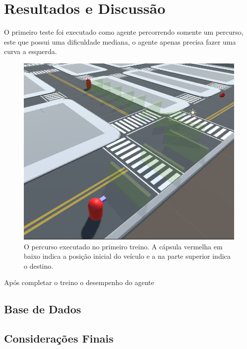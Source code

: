 \chapter{Resultados e Discussão}\label{cap:resultados}

O primeiro teste foi executado como agente percorrendo somente um percurso, este que possui uma dificuldade mediana, o agente apenas precisa fazer uma curva a esquerda.

\begin{figure}[h]
    \centering
    \includegraphics[scale=0.35]{figs/rotas/path_1.png}
     \caption{O percurso executado no primeiro treino. A cápsula vermelha em baixo indica a posição inicial do veículo e a na parte superior indica o destino.}
     \label{fig:rota-1}
  \end{figure}
 
Após completar o treino o desempenho do agente 

\section{Base de Dados}

\lipsum[72]

\section{Considerações Finais}

\lipsum[74]